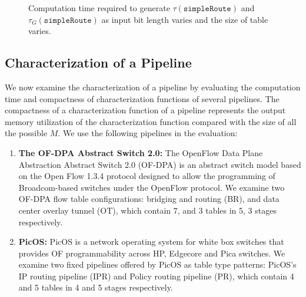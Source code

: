 \begin{figure}
  \centering
  \hspace{1in}
  \caption{Computation time required to generate $\tau(\texttt{simpleRoute})$ and $\tau_G(\texttt{simpleRoute})$ as input bit length varies and the size of table varies.}
  \label{fig:eval-ct}
\end{figure}

\subsection{Characterization of a Pipeline}


We now examine the characterization of a pipeline by evaluating the computation time and compactness of characterization functions of several pipelines. The compactness of a characterization function of a pipeline represents the output memory utilization of the characterization function compared with the size of all the possible $M$. We use the following pipelines in the evaluation:

\begin{enumerate}
  \item \textbf{The OF-DPA Abstract Switch 2.0:} The OpenFlow Data Plane Abstraction Abstract Switch 2.0 (OF-DPA) is an abstract switch model based on the Open Flow 1.3.4 protocol designed to allow the programming of Broadcom-based switches under the OpenFlow protocol. We examine two OF-DPA flow table configurations: bridging and routing (BR), and data center overlay tunnel (OT), which contain 7, and 3 tables in 5, 3 stages respectively.~\cite{OF-DPA}

  \item \textbf{PicOS:} PicOS is a network operating system for white box switches that provides OF programmability across HP, Edgecore and Pica switches. We examine two fixed pipelines offered by PicOS as table type patterns: PicOS's IP routing pipeline (IPR) and Policy routing pipeline (PR), which contain 4 and 5 tables in 4 and 5 stages respectively.~\cite{PicOS}
\end{enumerate}

